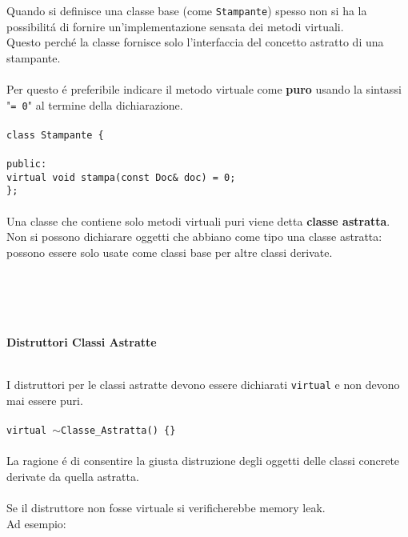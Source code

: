 \documentclass{article}
\newcommand\tab[1][1cm]{\hspace*{#1}}
\newcommand\TILDE{$\sim$}
\begin{document}
Quando si definisce una classe base (come \texttt{Stampante}) spesso non si ha la possibilit\'a di fornire un'implementazione sensata dei metodi virtuali.\\Questo perch\'e la classe fornisce solo l'interfaccia del concetto astratto di una stampante.\\ \\Per questo \'e preferibile indicare il metodo virtuale come \textbf{puro} usando la sintassi "\texttt{= 0}" al termine della  dichiarazione. \\ \\ 
\texttt{class Stampante \{ \\ \\ \tab public: \\ \tab \tab virtual void stampa(const Doc\& doc) = 0; \\ \};} \\ \\Una classe che contiene solo metodi virtuali puri viene detta \textbf{classe astratta}.\\Non si possono dichiarare oggetti che abbiano come tipo una classe astratta: possono essere solo usate come classi base per altre classi derivate.
\\ \\ \\ \\ \\
\begin{large}\textbf{\textcolor{blu}{Distruttori Classi Astratte}} \\ \\ \end{large}
I distruttori per le classi astratte devono essere dichiarati \texttt{virtual} e non devono mai essere puri.\\ \\ \texttt{virtual \TILDE Classe\_Astratta() \{\}} \\ \\La ragione \'e di consentire la giusta distruzione degli oggetti delle classi concrete derivate da quella astratta.\\ \\Se il distruttore non fosse virtuale si verificherebbe memory leak.\\Ad esempio:\\ \\
\end{document}
